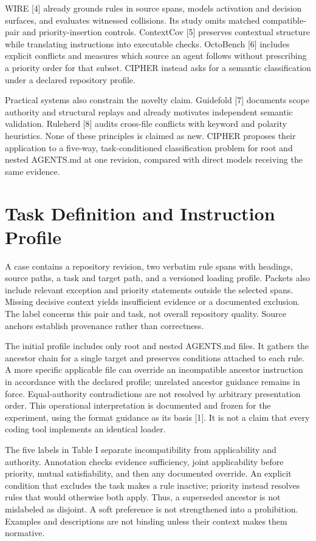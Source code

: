 \documentclass[10pt,conference]{IEEEtran}
\begin{document}
WIRE [4] already grounds rules in source spans, models activation and decision surfaces, and evaluates witnessed collisions. Its study omits matched compatible-pair and priority-insertion controls. ContextCov [5] preserves contextual structure while translating instructions into executable checks. OctoBench [6] includes explicit conflicts and measures which source an agent follows without prescribing a priority order for that subset. CIPHER instead asks for a semantic classification under a declared repository profile.


Practical systems also constrain the novelty claim. Guidefold [7] documents scope authority and structural replays and already motivates independent semantic validation. Ruleherd [8] audits cross-file conflicts with keyword and polarity heuristics. None of these principles is claimed as new. CIPHER proposes their application to a five-way, task-conditioned classification problem for root and nested AGENTS.md at one revision, compared with direct models receiving the same evidence.


\section{Task Definition and Instruction Profile}

A case contains a repository revision, two verbatim rule spans with headings, source paths, a task and target path, and a versioned loading profile. Packets also include relevant exception and priority statements outside the selected spans. Missing decisive context yields insufficient evidence or a documented exclusion. The label concerns this pair and task, not overall repository quality. Source anchors establish provenance rather than correctness.


The initial profile includes only root and nested AGENTS.md files. It gathers the ancestor chain for a single target and preserves conditions attached to each rule. A more specific applicable file can override an incompatible ancestor instruction in accordance with the declared profile; unrelated ancestor guidance remains in force. Equal-authority contradictions are not resolved by arbitrary presentation order. This operational interpretation is documented and frozen for the experiment, using the format guidance as its basis [1]. It is not a claim that every coding tool implements an identical loader.


The five labels in Table I separate incompatibility from applicability and authority. Annotation checks evidence sufficiency, joint applicability before priority, mutual satisfiability, and then any documented override. An explicit condition that excludes the task makes a rule inactive; priority instead resolves rules that would otherwise both apply. Thus, a superseded ancestor is not mislabeled as disjoint. A soft preference is not strengthened into a prohibition. Examples and descriptions are not binding unless their context makes them normative.
\end{document}

